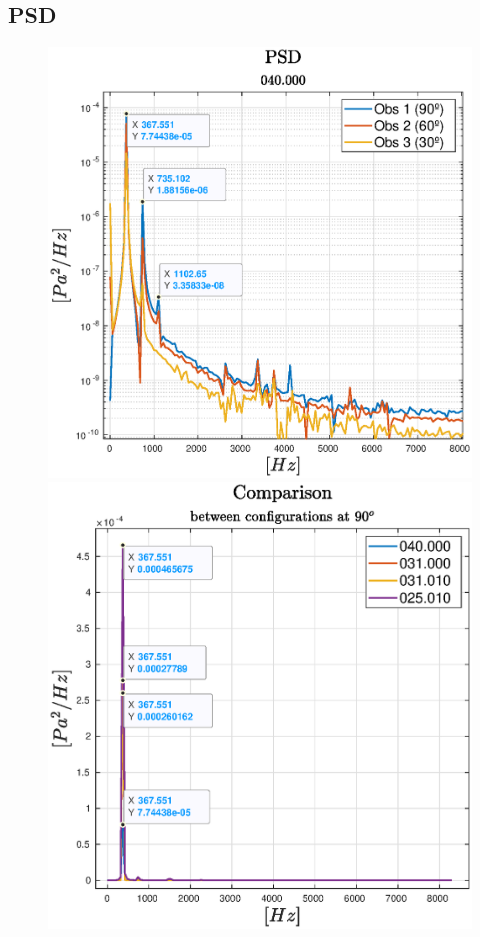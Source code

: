 \subsection{PSD}
\begin{frame}{\subsecname}
    \begin{figure} [H]  
	\centering
	\subfloat
	{\includegraphics[scale=0.305]{Photos/psd_040000.eps}}
  \quad
	\subfloat
	{\includegraphics[scale=0.305]{Photos/psd_comparison.eps}
  }
\end{figure}
\begin{center}
    

\end{center}
\end{frame}
